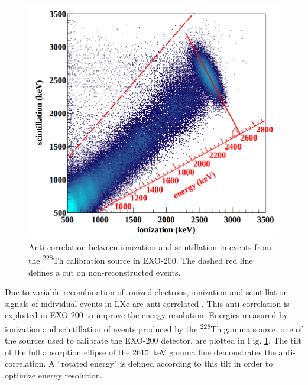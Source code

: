 \begin{figure} %
	\centering
	\includegraphics[width=.5\textwidth]{figures/anticorr.png}
	\caption{Anti-correlation between ionization and scintillation in events from the \textsuperscript{228}Th calibration source in EXO-200.  The dashed red line defines a cut on non-reconstructed events. \cite{EXO2000nuOriginal}}
\label{fig:antiCorr}
\end{figure}

Due to variable recombination of ionized electrons, ionization and scintillation signals of individual events in LXe are anti-correlated \cite{anticorr}.  This anti-correlation is exploited in EXO-200 to improve the energy resolution.  Energies measured by ionization and scintillation of events produced by the \textsuperscript{228}Th gamma source, one of the sources used to calibrate the EXO-200 detector, are plotted in Fig. \ref{fig:antiCorr}.  The tilt of the full absorption ellipse of the 2615~keV gamma line demonstrates the anti-correlation.  A ``rotated energy" is defined according to this tilt in order to optimize energy resolution.


